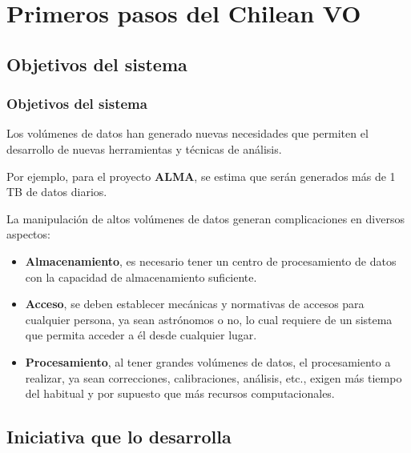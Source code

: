 \section{Primeros pasos del Chilean VO}

\subsection{Objetivos del sistema}

\begin{frame}
\frametitle{Objetivos del sistema}
\begin{multicols}{2}
Los volúmenes de datos han generado nuevas necesidades que
permiten el desarrollo de nuevas herramientas y técnicas de análisis.

Por ejemplo, para el proyecto \textbf{ALMA}, se estima que
serán generados más de 1 TB de datos diarios.

La manipulación de altos volúmenes de datos generan complicaciones en diversos
aspectos:
\begin{itemize}
    \item <2->\textbf{Almacenamiento}, es necesario tener un centro de procesamiento de datos con
        la capacidad de almacenamiento suficiente.\\
    \item <3->\textbf{Acceso}, se deben establecer mecánicas y normativas de accesos para
        cualquier persona, ya sean astrónomos o no, lo cual requiere de un sistema que
        permita acceder a él desde cualquier lugar. \\
    \item <4->\textbf{Procesamiento}, al tener grandes volúmenes de datos, el procesamiento a
        realizar, ya sean correcciones, calibraciones, análisis, etc., exigen más tiempo
        del habitual y por supuesto que más recursos computacionales.\\
\end{itemize}

\end{multicols}
\end{frame}

\subsection{Iniciativa que lo desarrolla}

